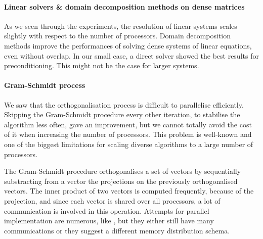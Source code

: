\paragraph{Linear solvers \& domain decomposition methods on dense matrices}
As we seen through the experiments, the resolution of linear systems scales slightly with respect to the number of processors.
Domain decomposition methods improve the performances of solving dense systems of linear equations, even without overlap.
In our small case, a direct solver showed the best results for preconditioning.
This might not be the case for larger systems.

\paragraph{Gram-Schmidt process}
We saw that the orthogonalisation process is difficult to parallelise efficiently.
Skipping the Gram-Schmidt procedure every other iteration, to stabilise the algorithm less often, gave an improvement, but we cannot totally avoid the cost of it when increasing the number of processors.
This problem is well-known and one of the biggest limitations for scaling diverse algorithms to a large number of processors.

The Gram-Schmidt procedure orthogonalises a set of vectors by sequentially substracting from a vector the projections on the previously orthogonalised vectors.
The inner product of two vectors is computed frequently, because of the projection, and since each vector is shared over all processors, a lot of communication is involved in this operation.
Attempts for parallel implementation are numerous, like \cite{katagiri_parallel_gram_schmidt_2003}, but they either still have many communications or they suggest a different memory distribution schema.

